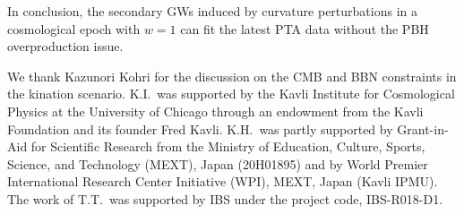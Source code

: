 \documentclass[superscriptaddress, aps, preprintnumbers,
amsmath, amssymb, sort&compress, nofootinbib, 10pt, paper, floatfix]{revtex4-2}
\begin{document}
In conclusion, the secondary GWs induced by curvature perturbations in a cosmological epoch with $w=1$ can fit the latest PTA data without the PBH overproduction issue.  


\acknowledgments
We thank Kazunori Kohri for the discussion on the CMB and BBN constraints in the kination scenario. 
K.I.~was supported by the Kavli Institute
for Cosmological Physics at the University of Chicago
through an endowment from the Kavli Foundation and
its founder Fred Kavli.
K.H.~was partly supported by Grant-in-Aid for Scientific Research from the Ministry of Education, Culture, Sports, Science, and Technology (MEXT), Japan (20H01895) and by World Premier International Research Center Initiative (WPI), MEXT, Japan (Kavli IPMU).
The work of T.T.~was supported by IBS under the project code, IBS-R018-D1.


\small


\end{document}
